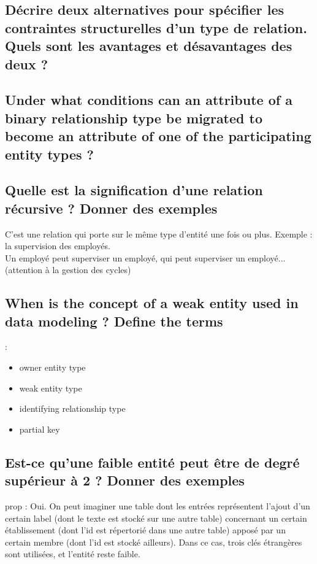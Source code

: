 \subsection{Décrire deux alternatives pour spécifier les contraintes structurelles d'un type de relation. Quels sont les avantages et désavantages des deux ?}

\subsection{Under what conditions can an attribute of a binary relationship type be migrated to become an attribute of one of the participating entity types ?}


\subsection{Quelle est la signification d'une relation récursive ? Donner des exemples}
C'est une relation qui porte sur le même type d'entité une fois ou plus.
Exemple : la supervision des employés. \\
Un employé peut superviser un employé, qui peut superviser un employé... (attention à la gestion des cycles)\\

\subsection{When is the concept of a weak entity used in data modeling ? Define the terms} :
\begin{itemize}
	\item owner entity type
	\item weak entity type
	\item identifying relationship type
	\item partial key
\end{itemize}

\subsection{Est-ce qu'une faible entité peut être de degré supérieur à 2 ? Donner des exemples}
prop :
Oui. On peut imaginer une table dont les entrées représentent l'ajout d'un certain label (dont le texte est stocké sur une autre table) 
concernant un certain établissement (dont l'id est répertorié dans une autre table) apposé par un certain membre 
(dont l'id est stocké ailleurs). Dans ce cas, 
trois clés étrangères sont utilisées, et l'entité reste faible.

